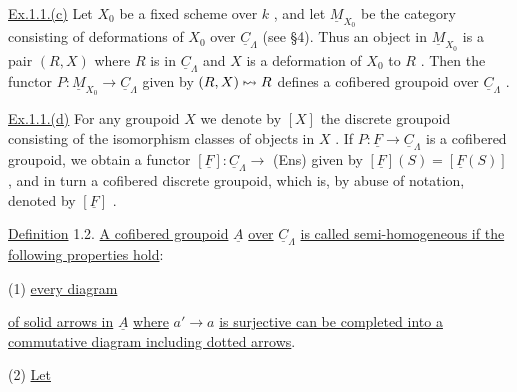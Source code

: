 \underline{Ex.1.1.(c)}  Let  $X_0$  be a fixed scheme over  $k$  , and let  $\underline{M}_{X_0}$  be the category consisting of deformations of  $X_0$  over  $\underline{C}_{\Lambda}$  (see §4). Thus an object in $\underline{M}_{X_0}$  is a pair  $(R,X)$  where  $R$  is in  $\underline{C}_{\Lambda}$  and  $X$  is a deformation of  $X_0$  to $R$  . Then the functor  $P : \underline{M}_{X_0} \to \underline{C}_{\Lambda}$  given by  $(R,X) \mathrel{\mapstochar\rightsquigarrow} R$  defines a cofibered groupoid over  $\underline{C}_{\Lambda}$  .

\underline{Ex.1.1.(d)}  For any groupoid  $X$  we denote by  $[X]$  the discrete groupoid consisting of the isomorphism classes of objects in  $X$  . If  $P : \underline{F} \to \underline{C}_{\Lambda}$  is a cofibered groupoid, we obtain a functor  $[\underline{F}] : \underline{C}_{\Lambda} \to$ (Ens)  given by $[\underline{F}](S) = [\underline{F}(S)]$  , and in turn a cofibered discrete groupoid, which is, by abuse of notation, denoted by  $[\underline{F}]$  .

\underline{Definition} 1.2.  \underline{A cofibered groupoid}  $\underline{A}$  \underline{over}  $\underline{C}_{\Lambda}$  \underline{is called semi-homogeneous if the following properties hold}:

(1) \underline{every diagram}

\begin{center}
\end{center}
\underline{of solid arrows in}  $\underline{A}$  \underline{where}  $a' \to a$  \underline{is surjective can be completed into a commutative diagram including dotted arrows}.

(2) \underline{Let}

